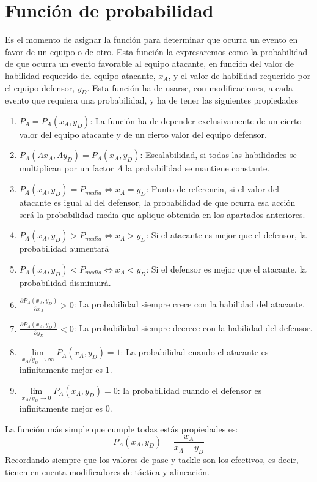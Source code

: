 \documentclass[a4paper,9pt]{article}
\begin{document}
\section{Función de probabilidad}\label{subsec:ProbFunction}
Es el momento de asignar la función para determinar que ocurra un evento en favor de un equipo o de otro. Esta función la expresaremos como la probabilidad de que ocurra un evento favorable al equipo atacante, en función del valor de habilidad requerido del equipo atacante, $x_A$, y el valor de habilidad requerido por el equipo defensor, $y_D$. Esta función ha de usarse, con modificaciones, a cada evento que requiera una probabilidad, y ha de tener las siguientes propiedades
\begin{enumerate}
	\item $P_A = P_A(x_A, y_D)$: La función ha de depender exclusivamente de un cierto valor del equipo atacante y de un cierto valor del equipo defensor.
	\item $P_A(\Lambda x_A, \Lambda y_D) = P_A(x_A, y_D)$: Escalabilidad, si todas las habilidades se multiplican por un factor $\Lambda$ la probabilidad se mantiene constante.
	\item $P_A(x_A, y_D) = P_{media} \iff x_A = y_D$: Punto de referencia, si el valor del atacante es igual al del defensor, la probabilidad de que ocurra esa acción será la probabilidad media que aplique obtenida en los apartados anteriores.
	\item $P_A(x_A, y_D) > P_{media} \iff x_A > y_D$: Si el atacante es mejor que el defensor, la probabilidad aumentará
	\item $P_A(x_A, y_D) < P_{media} \iff x_A < y_D$: Si el defensor es mejor que el atacante, la probabilidad disminuirá.
	\item $\frac{\partial P_A(x_A, y_D)}{\partial x_A} > 0 $: La probabilidad siempre crece con la habilidad del atacante.
	\item $\frac{\partial P_A(x_A, y_D)}{\partial y_D} < 0 $: La probabilidad siempre decrece con la habilidad del defensor.
	\item $\lim\limits_{x_A/y_D\to\infty} P_A(x_A, y_D) = 1$: La probabilidad cuando el atacante es infinitamente mejor es 1.
	\item $\lim\limits_{x_A/y_D\to 0} P_A(x_A, y_D) = 0$: la probabilidad cuando el defensor es infinitamente mejor es 0.
\end{enumerate}
La función más simple que cumple todas estás propiedades es:
\begin{equation}
	P_A(x_A, y_D) = \frac{x_A}{x_A+y_D}
\end{equation}
Recordando siempre que los valores de pase y tackle son los efectivos, es decir, tienen en cuenta modificadores de táctica y alineación.
\end{document}
